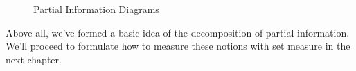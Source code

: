 \begin{figure}
\centering
{}%
%
\centering
\caption{Partial Information Diagrams}
\label{fig:pidiagram}
\end{figure}


Above all, we've formed a basic idea of the decomposition of partial information. We'll proceed to formulate how to measure these notions with set measure in the next chapter.




